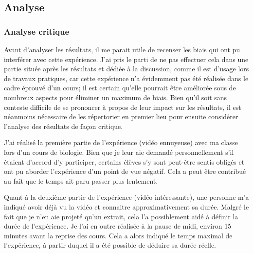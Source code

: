\documentclass[12pt,fleqn,oneside,french,openany]{book} %
\begin{document}
\subsection{Analyse} \label{ssec:analyse1.1}

\subsubsection{Analyse critique} \label{sssec:analyseCrit1.1}
Avant d'analyser les résultats, il me parait utile de recenser les biais qui ont pu interférer avec cette expérience. J'ai pris le parti de ne pas effectuer cela dans une partie située après les résultats et dédiée à la discussion, comme il est d'usage lors de travaux pratiques, car cette expérience n'a évidemment pas été réalisée dans le cadre éprouvé d'un cours; il est certain qu'elle pourrait être améliorée sous de nombreux aspects pour éliminer un maximum de biais. Bien qu'il soit sans conteste difficile de se prononcer à propos de leur impact sur les résultats, il est néanmoins nécessaire de les répertorier en premier lieu pour ensuite considérer l'analyse des résultats de façon critique.

J'ai réalisé la première partie de l'expérience (vidéo ennuyeuse) avec ma classe lors d'un cours de biologie. Bien que je leur aie demandé personnellement s'il étaient d'accord d'y participer, certains élèves s'y sont peut-être sentis obligés et ont pu aborder l'expérience d'un point de vue négatif. Cela a peut être contribué au fait que le temps ait paru passer plus lentement.

Quant à la deuxième partie de l'expérience (vidéo intéressante), une personne m'a indiqué avoir déjà vu la vidéo et connaitre approximativement sa durée. Malgré le fait que je n'en aie projeté qu'un extrait, cela l'a possiblement aidé à définir la durée de l'expérience.
Je l'ai en outre réalisée à la pause de midi, environ 15 minutes avant la reprise des cours. Cela a alors indiqué le temps maximal de l'expérience, à partir duquel il a été possible de déduire sa durée réelle. 
\end{document}

